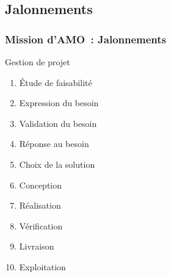 \subsection{Jalonnements}

\begin{frame}
	\frametitle{Mission d'AMO~: Jalonnements}
	\begin{block}{Gestion de projet}
		\begin{enumerate}
			\item Étude de faisabilité
			\item Expression du besoin
			\item Validation du besoin
			\item Réponse au besoin
			\item Choix de la solution
			\item Conception
			\item Réalisation
			\item Vérification
			\item Livraison
			\item Exploitation
		\end{enumerate}
	\end{block}
\end{frame}

